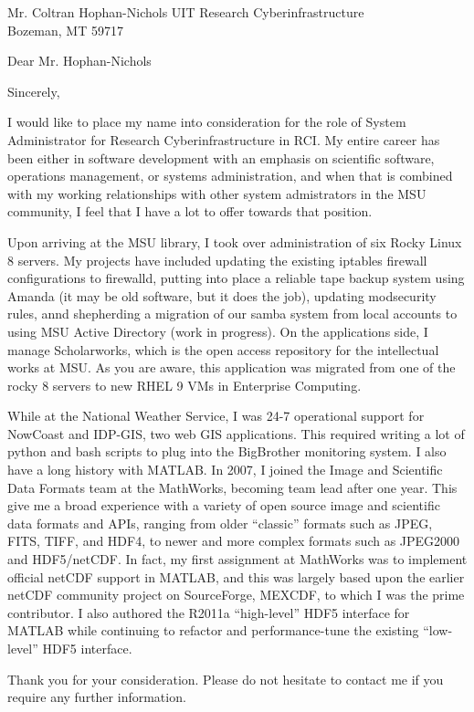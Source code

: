\documentclass[11pt]{moderncv}  %
\begin{document}
\recipient
{Mr. Coltran Hophan-Nichols}
{UIT Research Cyberinfrastructure\\Bozeman, MT 59717}
\opening{Dear Mr. Hophan-Nichols}
\closing{Sincerely,}


\makelettertitle

I would like to place my name into consideration for the role of
System Administrator for Research Cyberinfrastructure in RCI.  My
entire career has been either in software development with an
emphasis on scientific software, operations management, or systems
administration, and when that is combined with my  working relationships
with other system admistrators in the MSU community, I feel that I
have a lot to offer towards that position.

Upon arriving at the MSU library, I took over administration of six
Rocky Linux 8 servers.  My projects have included updating the
existing iptables firewall configurations to firewalld, putting
into place a reliable tape backup system using Amanda (it may be
old software, but it does the job), updating modsecurity rules,
annd shepherding a migration of our samba system from local accounts
to using MSU Active Directory (work in progress).  On the applications
side, I manage Scholarworks, which is the open access repository
for the intellectual works at MSU.  As you are aware, this application
was migrated from one of the rocky 8 servers to new RHEL 9 VMs in
Enterprise Computing.

While at the National Weather Service, I was 24-7 operational support for NowCoast
and IDP-GIS, two web GIS applications.  This required writing a lot of python
and bash scripts to plug into the BigBrother monitoring system.  I also have
a long history with MATLAB.  In 2007, I joined the Image and
Scientific Data Formats team at the MathWorks, becoming  team lead
after one year.  This give me a broad experience with a variety of
open source image and scientific data formats and APIs, ranging
from older “classic” formats such as JPEG, FITS, TIFF, and HDF4,
to newer and more complex formats such as JPEG2000 and HDF5/netCDF.
In fact, my first assignment at MathWorks was to implement official
netCDF support in MATLAB, and this was largely based upon the earlier
netCDF community project on SourceForge, MEXCDF, to which I was the
prime contributor.   I also authored the R2011a “high-level” HDF5
interface for MATLAB while continuing to refactor and performance-tune
the existing “low-level” HDF5 interface.


Thank you for your consideration.  Please do not hesitate to contact me if you require any further information.

\makeletterclosing
\end{document}
